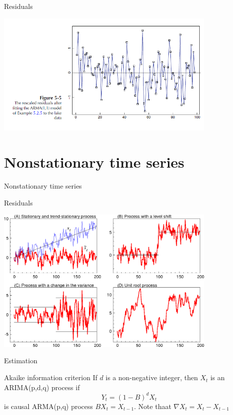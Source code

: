 \documentclass[11pt]{beamer}
\begin{document}
\begin{frame}{Residuals \cite{brockwell2002introduction}}
    \begin{center}
     \includegraphics[width=0.8\textwidth]{Pic/Residuals.png}
    \end{center}
\end{frame}

\section{Nonstationary time series}
\begin{frame}
\begin{center}
\Huge
Nonstationary time series
\end{center}
\end{frame}

\begin{frame}{Residuals \cite{brockwell2002introduction,ur}}
    \begin{center}
     \includegraphics[width=0.8\textwidth]{Pic/unit_root_ts.png}
    \end{center}
\end{frame}

\begin{frame}{Estimation \cite{brockwell2002introduction}}
\begin{alertblock}{Akaike information criterion}
If $d$ is a non-negative integer, then ${X_{t}}$ is an ARIMA(p,d,q) process if 
\begin{equation*}
Y_{t}=(1-B)^{d}X_{t}
\end{equation*}
is causal ARMA(p,q) process $BX_{t}=X_{t-1}$. Note thaat $\nabla X_{t}=X_{t}-X_{t-1}$
\end{alertblock}
\end{frame}
\end{document}
